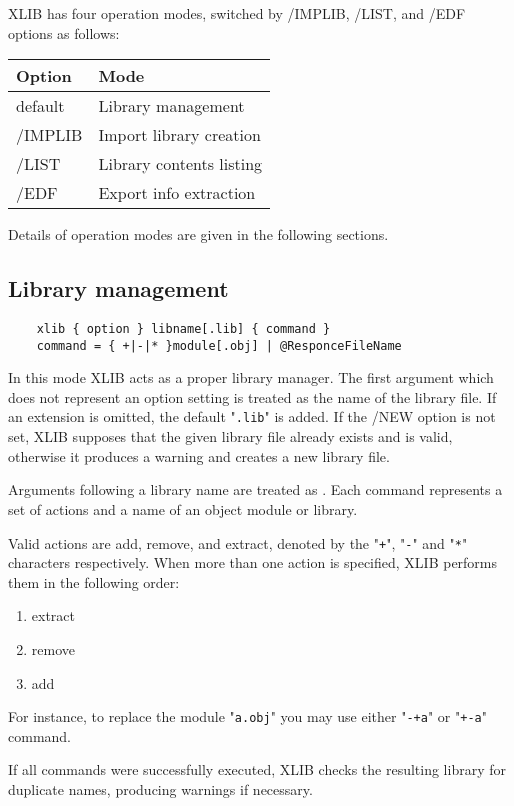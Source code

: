 XLIB has four operation modes, switched by
/IMPLIB, /LIST, and /EDF options as follows:

\begin{tabular}{ll}
\bf Option & Mode \\
\hline
default  & Library management \\
/IMPLIB  & Import library creation \\
/LIST    & Library contents listing \\
/EDF     & Export info extraction
\end{tabular}

Details of operation modes are given in the following sections.

\subsection{Library management}
\label{xlib:modes:management}

\begin{verbatim}
    xlib { option } libname[.lib] { command }
    command = { +|-|* }module[.obj] | @ResponceFileName
\end{verbatim}

In this mode XLIB acts as a proper library manager. The first
argument which does not represent an option setting is treated as
the name of the library file. If an extension is omitted, the
default "\verb'.lib'" is added. If the /NEW option is not set,
XLIB supposes that the given library file already exists and is
valid, otherwise it produces a warning and creates a new library file.

Arguments following a library name are treated as
.
Each command represents a set of actions and
a name of an object module or library.

Valid actions are add, remove, and extract, denoted by the
"\verb'+'", "\verb'-'" and "\verb'*'" characters respectively.
When more than one action is specified, XLIB performs them in the following order:

\begin{enumerate}
\item extract
\item remove
\item add
\end{enumerate}

For instance, to replace the module "\verb'a.obj'"
you may use either "\verb'-+a'" or
"\verb'+-a'" command.

If all commands were successfully executed, XLIB checks the resulting
library for duplicate names, producing warnings if necessary.

